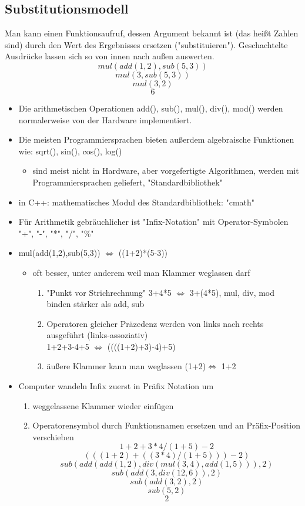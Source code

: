 \documentclass[a4paper]{scrartcl}
\theoremstyle{definition}
\theoremstyle{plain}
\theoremstyle{remark}
\theoremstyle{remark}
\begin{document}
\subsection{Substitutionsmodell}
\label{sec-4-1}
Man kann einen Funktionsaufruf, dessen Argument bekannt ist (das heißt Zahlen sind) durch den Wert des Ergebnisses ersetzen ("substituieren"). Geschachtelte Ausdrücke lassen sich so von innen nach außen auswerten.
\[mul(add(1,2),sub(5,3))\]
\[mul(3,sub(5,3))\]
\[mul(3,2)\]
\[6\]
\begin{itemize}
\item Die arithmetischen Operationen add(), sub(), mul(), div(), mod() werden normalerweise von der Hardware implementiert.
\item Die meisten Programmiersprachen bieten außerdem algebraische Funktionen wie: sqrt(), sin(), cos(), log()
\begin{itemize}
\item sind meist nicht in Hardware, aber vorgefertigte Algorithmen, werden mit Programmiersprachen geliefert, "Standardbibliothek"
\end{itemize}
\item in C++: mathematisches Modul des Standardbibliothek: "cmath"
\item Für Arithmetik gebräuchlicher ist "Infix-Notation" mit Operator-Symbolen "+", "-", "*", "/", "\%"
\item mul(add(1,2),sub(5,3)) $\iff$ ((1+2)*(5-3))
\begin{itemize}
\item oft besser, unter anderem weil man Klammer weglassen darf
\begin{enumerate}
\item "Punkt vor Strichrechnung" 3+4*5 $\iff$ 3+(4*5), mul, div, mod binden stärker als add, sub
\item Operatoren gleicher Präzedenz werden von links nach rechts ausgeführt (links-assoziativ) \\
          1+2+3-4+5 $\iff$ ((((1+2)+3)-4)+5)
\item äußere Klammer kann man weglassen (1+2)$\iff$ 1+2
\end{enumerate}
\end{itemize}
\item Computer wandeln Infix zuerst in Präfix Notation um
\begin{enumerate}
\item weggelassene Klammer wieder einfügen
\item Operatorensymbol durch Funktionsnamen ersetzen und an Präfix-Position verschieben
\[1 + 2 + 3 * 4 / (1 + 5) - 2\]
\[(((1 + 2) + ((3 * 4) / (1 + 5))) - 2)\]
\[sub(add(add(1,2),div(mul(3,4),add(1,5))), 2)\]
\[sub(add(3,div(12,6)), 2)\]
\[sub(add(3,2), 2)\]
\[sub(5, 2)\]
\[2\]
\end{enumerate}
\end{itemize}
\end{document}
